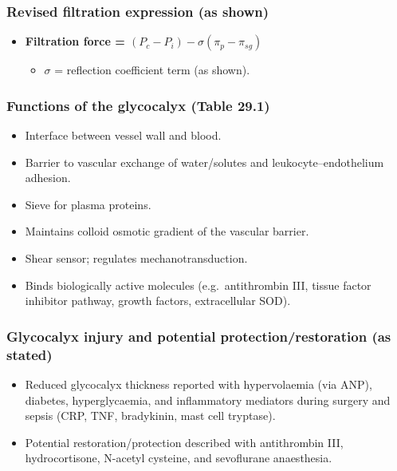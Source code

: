 \documentclass[11pt,a4paper]{article}
\begin{document}
\subsubsection{Revised filtration expression (as shown)}
\begin{itemize}
\item \textbf{Filtration force = $(P_c - P_i) - \sigma(\pi_p - \pi_{sg})$}
  \begin{itemize}
  \item $\sigma$ = reflection coefficient term (as shown).
  \end{itemize}
\end{itemize}

\subsubsection{Functions of the glycocalyx (Table 29.1)}
\begin{itemize}
\item Interface between vessel wall and blood.
\item Barrier to vascular exchange of water/solutes and leukocyte--endothelium adhesion.
\item Sieve for plasma proteins.
\item Maintains colloid osmotic gradient of the vascular barrier.
\item Shear sensor; regulates mechanotransduction.
\item Binds biologically active molecules (e.g.\ antithrombin III, tissue factor inhibitor pathway, growth factors, extracellular SOD).
\end{itemize}

\subsubsection{Glycocalyx injury and potential protection/restoration (as stated)}
\begin{itemize}
\item Reduced glycocalyx thickness reported with hypervolaemia (via ANP), diabetes, hyperglycaemia, and inflammatory mediators during surgery and sepsis (CRP, TNF, bradykinin, mast cell tryptase).
\item Potential restoration/protection described with antithrombin III, hydrocortisone, N-acetyl cysteine, and sevoflurane anaesthesia.
\end{itemize}
\end{document}
